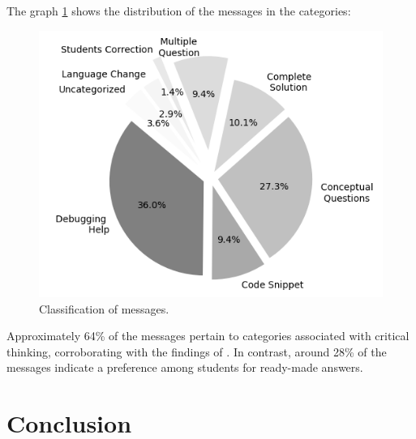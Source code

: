 \documentclass[conference]{IEEEtran}
\begin{document}
The graph \ref{fig:graph1} shows the distribution of the messages in the
categories:
\begin{figure}[h!]
    \centering
    \includegraphics[scale=0.7]{figures/figure1.png}
    \caption{Classification of messages.}
    \label{fig:graph1}
\end{figure}

Approximately 64\% of the messages pertain to categories associated with
critical thinking, corroborating with the findings of
\cite{Ghimire24}. In contrast, around 28\% of the messages
indicate a preference among students for ready-made answers.

\section{Conclusion}



\end{document}

